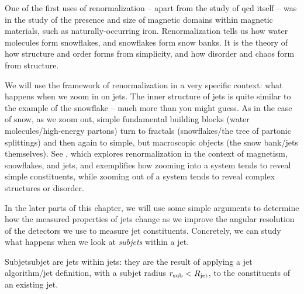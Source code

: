 

One of the first uses of renormalization -- apart from the study of \gls{qcd} itself -- was in the study of the presence and size of magnetic domains within magnetic materials, such as naturally-occurring iron.
%
Renormalization tells us how water molecules form snowflakes, and snowflakes form snow banks.
%
It is the theory of how structure and order forms from simplicity, and how disorder and chaos form from structure.


We will use the framework of renormalization in a very specific context:
%
what happens when we zoom in on jets.
%
The inner structure of jets is quite similar to the example of the snowflake -- much more than you might guess.
%
As in the case of snow, as we zoom out, simple fundamental building blocks (water molecules/high-energy partons) turn to fractals (snowflakes/the tree of partonic splittings) and then again to simple, but macroscopic objects (the snow bank/jets themselves).
%
See , which explores renormalization in the context of magnetism, snowflakes, and jets, and exemplifies how zooming into a system tends to reveal simple constituents, while zooming out of a system tends to reveal complex structures or disorder.


In the later parts of this chapter, we will use some simple arguments to determine how the measured properties of jets change as we improve the angular resolution of the detectors we use to measure jet constituents.
%
Concretely, we can study what happens when we look at \textit{subjets} within a jet.
%
\begin{definitionbox}{Subjet}{subjet}
     are jets within jets:
    they are the result of applying a jet algorithm/jet definition, with a subjet radius \(r_\text{sub} < R_\text{jet}\), to the constituents of an existing jet.
\end{definitionbox}


